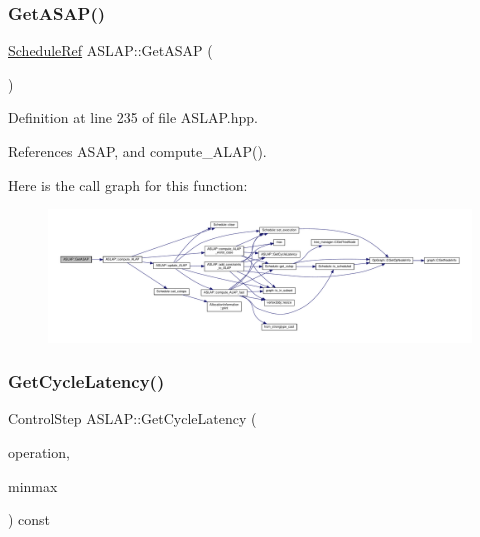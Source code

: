 \subsubsection{\texorpdfstring{Get\+A\+S\+A\+P()}{GetASAP()}}
{\footnotesize\ttfamily \hyperlink{schedule_8hpp_af67f402958b3b52a1ec5cc4ce08ae3b9}{Schedule\+Ref} A\+S\+L\+A\+P\+::\+Get\+A\+S\+AP (\begin{DoxyParamCaption}{ }\end{DoxyParamCaption})\hspace{0.3cm}{\ttfamily [inline]}}



Definition at line 235 of file A\+S\+L\+A\+P.\+hpp.



References A\+S\+AP, and compute\+\_\+\+A\+L\+A\+P().

Here is the call graph for this function\+:
\nopagebreak
\begin{figure}[H]
\begin{center}
\leavevmode
\includegraphics[width=350pt]{d9/d2a/classASLAP_ac0629687f10668f95901bc157bdd7d49_cgraph}
\end{center}
\end{figure}
\mbox{\label{classASLAP_a2d74ef008a1dd3b6bb59673afe419fac}} 
\subsubsection{\texorpdfstring{Get\+Cycle\+Latency()}{GetCycleLatency()}}
{\footnotesize\ttfamily Control\+Step A\+S\+L\+A\+P\+::\+Get\+Cycle\+Latency (\begin{DoxyParamCaption}\item[{const \hyperlink{graph_8hpp_abefdcf0544e601805af44eca032cca14}{vertex}}]{operation,  }\item[{\hyperlink{allocation_8hpp_ac615dfccdc03f10d085f4fd1c4c7912b}{Allocation\+\_\+\+Min\+Max}}]{minmax }\end{DoxyParamCaption}) const\hspace{0.3cm}{\ttfamily [private]}}




